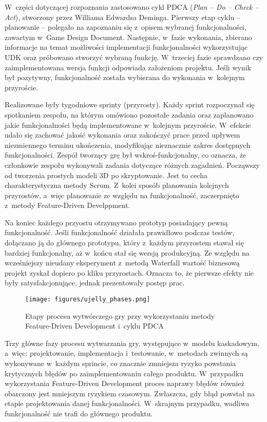 W~części dotyczącej rozpoznania zastosowano cykl PDCA (\emph{Plan -- Do -- Check -- Act}), stworzony przez Williama Edwardsa Deminga. Pierwszy etap cyklu -- planowanie -- polegało na zapoznaniu się z~opisem wybranej funkcjonalności, zawartym w~Game Design Document. Następnie, w~fazie wykonania, zbierano informacje na temat możliwości implementacji funkcjonalności wykorzystując UDK oraz próbowano stworzyć wybraną funkcję. W~trzeciej fazie sprawdzano czy zaimplementowana wersja funkcji odpowiada założeniom projektu. Jeśli wynik był pozytywny, funkcjonalność została wybierana do wykonania w~kolejnym przyroście.

Realizowane były tygodniowe sprinty (przyrosty). Każdy sprint rozpoczynał się spotkaniem zespołu, na którym omówiono pozostałe zadania oraz zaplanowano jakie funkcjonalności będą implementowane w~kolejnym przyroście. W~efekcie udało się zachować jakość wykonania oraz zakończyć prace przed upływem niezmiennego terminu ukończenia, modyfikując nieznacznie zakres dostępnych funkcjonalności. Zespół tworzący grę był wskroś-funkcjonalny, co oznacza, że członkowie zespołu wykonywali zadania dotyczące różnych zagadnień. Począwszy od tworzenia prostych modeli 3D po skryptowanie. Jest to cecha charakterystyczna metody Scrum. Z~kolei sposób planowania kolejnych przyrostów, a~więc planowanie ze względu na funkcjonalność, zaczerpnięto z~metody Feature-Driven Develppment. 

Na koniec każdego przyostu otrzymywano prototyp posiadający pewną funkcjonalność. Jeśli funkcjonalność działała prawidłowo podczas testów, dołączano ją do głównego prototypu, który z~każdym przyrostem stawał się bardziej funkcjonalny, aż w~końcu stał się wersją produkcyjną. Ze względu na wcześniejszy nieudany eksperyment z~metodą Waterfall wartość biznesową projekt zyskał dopiero po kliku przyrostach. Oznacza to, że pierwsze efekty nie były satysfakcjonujące, jednak prezentowały postęp prac. 

\begin{figure}
\begin{center}
\texttt{[image: figures/ujelly\_phases.png]}
\caption{Etapy procesu wytwórczego gry przy wykorzystaniu metody Feature-Driven Development i~cyklu PDCA}
\label{ujelly_phases}
\end{center}
\end{figure}

Trzy główne fazy procesu wytwarzania gry, występujące w~modelu kaskadowym, a~więc: projektowanie, implementacja i~testowanie, w~metodach zwinnych są wykonywane w~każdym sprincie, co znacznie zmniejsza ryzyko powstania krytycznych błędów po zaimplementowaniu całego produktu. W~przypadku wykorzystania Feature-Driven Development proces naprawy błędów również obarczony jest mniejszym ryzykiem czasowym. Zwłaszcza, gdy błąd powstał na etapie projektowania danej funkcjonalności. W~skrajnym przypadku, wadliwa funkcjonalność nie trafi do głównego produktu.
